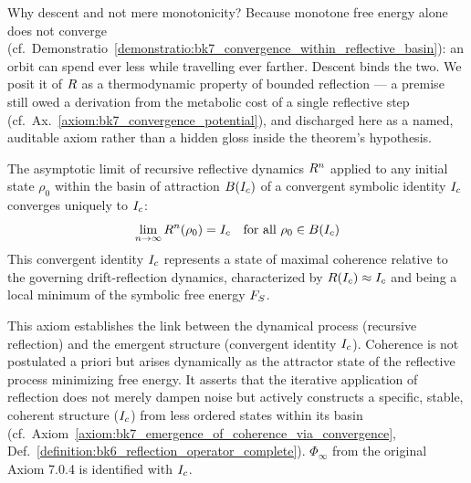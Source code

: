 \begin{remark}
\label{remark:bk7_caristi_descent_note}
Why descent and not mere monotonicity? Because monotone free energy alone does not converge (cf.~Demonstratio~\ref{demonstratio:bk7_convergence_within_reflective_basin}): an orbit can spend ever less while travelling ever farther. Descent binds the two. We posit it of \(R\) as a thermodynamic property of bounded reflection --- a premise still owed a derivation from the metabolic cost of a single reflective step (cf.~Ax.~\ref{axiom:bk7_convergence_potential}), and discharged here as a named, auditable axiom rather than a hidden gloss inside the theorem's hypothesis.
\end{remark}
\begin{axiom}
\label{axiom:bk7_emergence_of_coherence_via_convergence}
The asymptotic limit of recursive reflective dynamics \(R^n\) applied to any initial state \(\rho_0\) within the basin of attraction \(B(I_c)\) of a convergent symbolic identity \(I_c\) converges uniquely to \(I_c\):
\[
\lim_{n\to\infty} R^n(\rho_0) = I_c \quad \text{for all } \rho_0 \in B(I_c)
\]
This convergent identity \(I_c\) represents a state of maximal coherence relative to the governing drift-reflection dynamics, characterized by \(R(I_c) \approx I_c\) and being a local minimum of the symbolic free energy \(F_S\).
\end{axiom}
\begin{remark}
\label{remark:bk7_unnamed_remark_03}
This axiom establishes the link between the dynamical process (recursive reflection) and the emergent structure (convergent identity \(I_c\)). Coherence is not postulated a priori but arises dynamically as the attractor state of the reflective process minimizing free energy. It asserts that the iterative application of reflection does not merely dampen noise but actively constructs a specific, stable, coherent structure (\(I_c\)) from less ordered states within its basin (cf.~Axiom~\ref{axiom:bk7_emergence_of_coherence_via_convergence}, Def.~\ref{definition:bk6_reflection_operator_complete}). \(\Phi_\infty\) from the original Axiom 7.0.4 is identified with \(I_c\).
\end{remark}
